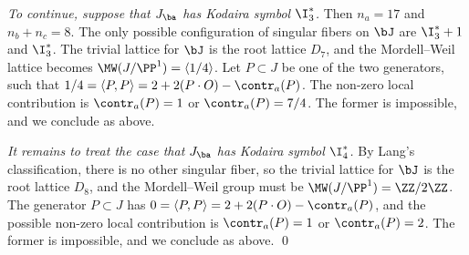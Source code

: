 \emph{To continue, suppose that  $J_\ba$ has Kodaira symbol $\I_3^*$.}
Then $n_a=17$ and $n_b+n_c=8$. The only possible configuration of singular fibers
on $\bJ$ are $\I_3^*+1$ and $\I_3^*$.
The trivial lattice for $\bJ$ is the root lattice $D_7$, and the Mordell--Weil lattice
becomes $\MW(J/\PP^1)=\langle 1/4\rangle$. Let $P\subset J$ be one of the two generators, such that
$1/4=\langle P,P\rangle = 2+2(P\cdot O) -\contr_a(P)$.
The   non-zero local contribution is $\contr_a(P)=1$ or $\contr_a(P)=7/4$.
The former is impossible, and we conclude as above.

\emph{It remains to treat the case that $J_\ba$ has Kodaira symbol $\I_4^*$.}
By Lang's classification, there is no other singular fiber,
so the trivial lattice for $\bJ$ is the root lattice $D_8$, and the Mordell--Weil group
must be $\MW(J/\PP^1)=\ZZ/2\ZZ$. The generator $P\subset J$ has
$0=\langle P,P\rangle = 2+2(P\cdot O) -\contr_a(P)$, and the possible non-zero local contribution is
$\contr_a(P)=1$ or $\contr_a(P)=2$. The former is impossible, and we conclude as above.
\qed
\fi

